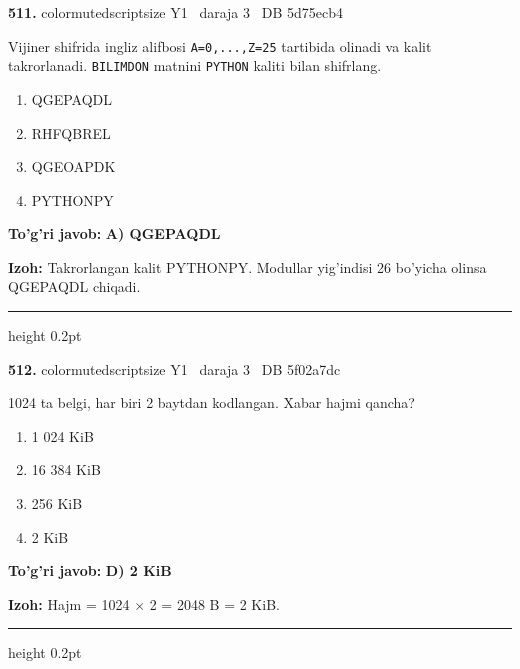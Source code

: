 \documentclass[10pt,a4paper,oneside]{article}
\begin{document}
\noindent\textbf{\color{ink}511.}  {color{muted}scriptsize Y1 \textbullet\ daraja 3 \textbullet\ DB 5d75ecb4}
\par
Vijiner shifrida ingliz alifbosi \texttt{A=0,...,Z=25} tartibida olinadi va kalit takrorlanadi. \texttt{BILIMDON} matnini \texttt{PYTHON} kaliti bilan shifrlang.
\begin{enumerate}[label=\Alph*),leftmargin=9mm]
\item QGEPAQDL
\item RHFQBREL
\item QGEOAPDK
\item PYTHONPY
\end{enumerate}
\begin{tcolorbox}[enhanced,breakable,colback=teal!4,colframe=teal!50!black,boxrule=0.5pt,arc=1.1mm,left=3mm,right=3mm,top=1.7mm,bottom=1.7mm,before skip=2mm,after skip=2mm]
\textbf{\color{teal}To'g'ri javob:} \textbf{A) QGEPAQDL}
\par\smallskip
\textbf{Izoh:} Takrorlangan kalit PYTHONPY. Modullar yig'indisi 26 bo'yicha olinsa QGEPAQDL chiqadi.
\end{tcolorbox}
\vspace{2mm}\hrule height 0.2pt \vspace{3mm}

\noindent\textbf{\color{ink}512.}  {color{muted}scriptsize Y1 \textbullet\ daraja 3 \textbullet\ DB 5f02a7dc}
\par
1024 ta belgi, har biri 2 baytdan kodlangan. Xabar hajmi qancha?
\begin{enumerate}[label=\Alph*),leftmargin=9mm]
\item 1 024 KiB
\item 16 384 KiB
\item 256 KiB
\item 2 KiB
\end{enumerate}
\begin{tcolorbox}[enhanced,breakable,colback=teal!4,colframe=teal!50!black,boxrule=0.5pt,arc=1.1mm,left=3mm,right=3mm,top=1.7mm,bottom=1.7mm,before skip=2mm,after skip=2mm]
\textbf{\color{teal}To'g'ri javob:} \textbf{D) 2 KiB}
\par\smallskip
\textbf{Izoh:} Hajm = 1024 \ensuremath{\times} 2 = 2048 B = 2 KiB.
\end{tcolorbox}
\vspace{2mm}\hrule height 0.2pt \vspace{3mm}
\end{document}
